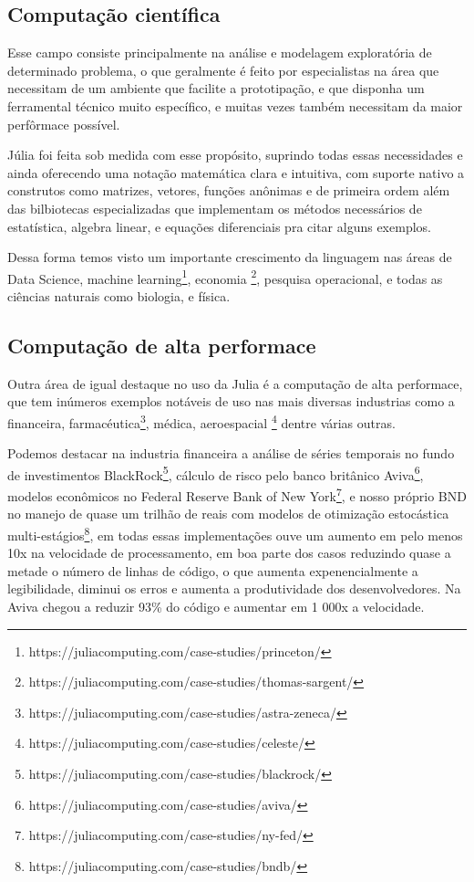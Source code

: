 \subsection{Computação científica}

Esse campo consiste principalmente na análise e modelagem exploratória de determinado problema, o que geralmente é feito por especialistas na área que necessitam de um ambiente que facilite a prototipação, e que disponha um ferramental técnico muito específico, e muitas vezes também necessitam da maior perfôrmace possível.

Júlia foi feita sob medida com esse propósito, suprindo todas essas necessidades e ainda oferecendo uma notação matemática clara e intuitiva, com suporte nativo a construtos como matrizes, vetores, funções anônimas e de primeira ordem além das bilbiotecas especializadas que implementam os métodos necessários de estatística, algebra linear, e equações diferenciais pra citar alguns exemplos. \cite{Klok2021}

Dessa forma temos visto um importante crescimento da linguagem nas áreas de Data Science, machine learning\footnote{https://juliacomputing.com/case-studies/princeton/}, 
economia \footnote{https://juliacomputing.com/case-studies/thomas-sargent/}, 
pesquisa operacional, e todas as ciências naturais como biologia, e física. \cite{Perkel2019}

\subsection{Computação de alta performace}
Outra área de igual destaque no uso da Julia é a computação de alta performace, que tem inúmeros exemplos notáveis de uso nas mais diversas industrias como a financeira, farmacéutica\footnote{https://juliacomputing.com/case-studies/astra-zeneca/}, médica, aeroespacial \footnote{https://juliacomputing.com/case-studies/celeste/} dentre várias outras. 

Podemos destacar na industria financeira a análise de séries temporais no fundo de investimentos BlackRock\footnote{https://juliacomputing.com/case-studies/blackrock/}, cálculo de risco pelo banco britânico Aviva\footnote{https://juliacomputing.com/case-studies/aviva/}, modelos econômicos no Federal Reserve Bank of New York\footnote{https://juliacomputing.com/case-studies/ny-fed/}, e nosso próprio BND no manejo de quase um trilhão de reais com modelos de otimização estocástica multi-estágios\footnote{https://juliacomputing.com/case-studies/bndb/}, em todas essas implementações ouve um aumento em pelo menos 10x na velocidade de processamento, em boa parte dos casos reduzindo quase a metade o número de linhas de código, o que aumenta expenencialmente a legibilidade, diminui os erros e aumenta a produtividade dos desenvolvedores. Na Aviva chegou a reduzir 93\% do código e aumentar em 1 000x a velocidade. 

